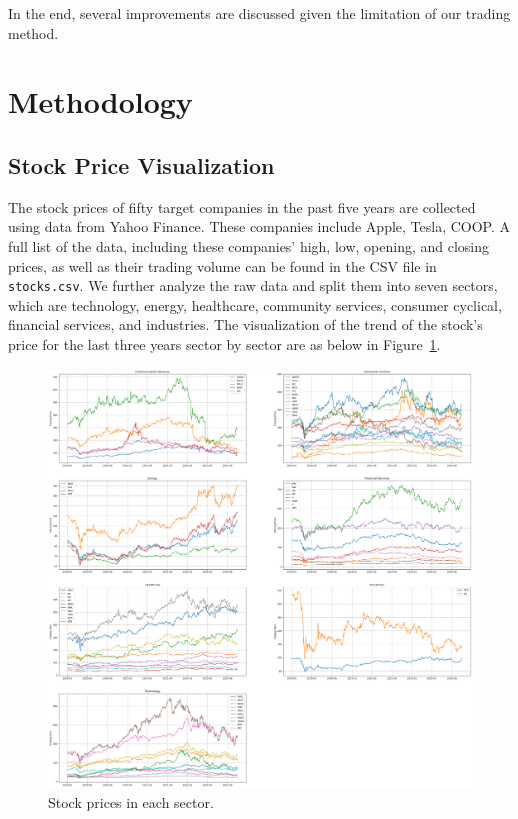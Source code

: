 \documentclass[a4paper, 11pt]{my-elegantpaper}
\begin{document}
In the end, several improvements are discussed given the limitation of our trading method. 



\section{Methodology} \label{sec:2}


\subsection{Stock Price Visualization}

The stock prices of fifty target companies in the past five years are collected using data from Yahoo Finance.  These companies include Apple, Tesla, COOP. A full list of the data, including these companies' high, low, opening, and closing prices, as well as their trading volume can be found in the CSV file in \texttt{stocks.csv}. We further analyze the raw data and split them into seven sectors, which are technology, energy, healthcare, community services, consumer cyclical, financial services, and industries. The visualization of the trend of the stock's price for the last three years sector by sector are as below in Figure~\ref{fig:1}.

\begin{figure}[H]
    \centering
    \includegraphics[scale=0.24]{figures/stocks.png}
    \caption{Stock prices in each sector.}
    \label{fig:1}
\end{figure}
\end{document}
